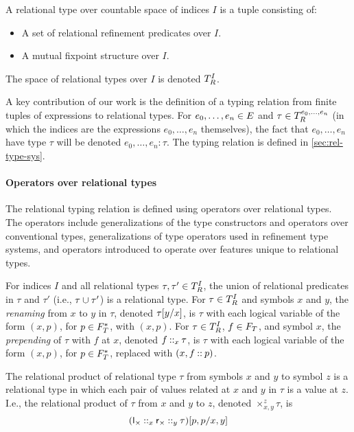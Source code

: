 
A relational type over countable space of indices $I$ is a tuple
consisting of:
%
\begin{itemize}
\item %
  A set of relational refinement predicates over $I$.
\item %
  A mutual fixpoint structure over $I$.
\end{itemize}
%
The space of relational types over $I$ is denoted $\reltypes{I}$.

A key contribution of our work is the definition of a typing relation
from finite tuples of expressions to relational types.
%
For $e_0, \ldots, e_n \in \expr$ and
$\tau \in \reltypes{e_0, \ldots, e_n}$ (in which the indices are the
expressions $e_0, \ldots, e_n$ themselves), the fact that
$e_0, \ldots, e_n$ have type $\tau$ will be denoted
$e_0, \ldots, e_n : \tau$.
%
The typing relation is defined in \autoref{sec:rel-type-sys}.

\paragraph{Operators over relational types}
The relational typing relation is defined using operators over
relational types.
%
The operators include generalizations of the type constructors and
operators over conventional types, generalizations of type operators
used in refinement type systems, and operators introduced to operate
over features unique to relational types.

For indices $I$ and all relational types
$\tau, \tau' \in \reltypes{I}$, the union of relational predicates in
$\tau$ and $\tau'$ (i.e., $\tau \union \tau'$) is a relational type.
For $\tau \in \reltypes{I}$ and symbols $x$ and $y$, the \emph{renaming}
from $x$ to $y$ in $\tau$, denoted $\replace{\tau}{x}{y}$, is $\tau$
with each logical variable of the form $(x, p)$, for $p \in \typepos$,
with $(x, p)$.
For $\tau \in \reltypes{I}$, $f \in \typosfields$, and symbol $x$, the
\emph{prepending} of $\tau$ with $f$ at $x$, denoted $f \cons_x \tau$,
is $\tau$ with each logical variable of the form $(x, p)$, for
$p \in \typepos$, replaced with $(x, f \cons p)$.

The relational product of relational type $\tau$ from symbols $x$ and
$y$ to symbol $z$ is a relational type in which each pair of values
related at $x$ and $y$ in $\tau$ is a value at $z$.
%
I.e., the relational product of $\tau$ from $x$ and $y$ to $z$,
denoted $\times_{x, y}^z \tau$, is
\[ \replace{ (\tyleftprod \cons_x \tyrightprod \cons_y \tau) }{ x, y }{ p, p }
\]

